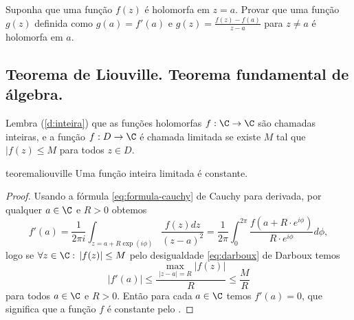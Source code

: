 \begin{problema}
\label{p:divide-holo}
Suponha que uma função $f(z)$ é holomorfa em $z=a$.
Provar que uma função $g(z)$ definida como $g(a) = f'(a)$
e $g(z) = \frac{f(z)-f(a)}{z-a}$ para $z\ne a$ é holomorfa em $a$.
\end{problema}

\subsection{Teorema de Liouville. Teorema fundamental de álgebra.}

Lembra (\cref{d:inteira}) que as funções holomorfas $f:\C\to\C$ são chamadas inteiras,
e a função $f:D\to\C$ é chamada limitada se existe $M$ tal que $|f(z)\leq M$ para todos $z\in D$.
\begin{restatable}[Liouville]{teorema}{liouville} \label{t:liouville}
Uma função inteira limitada é constante.
\end{restatable}
\begin{proof}
Usando a fórmula \eqref{eq:formula-cauchy} de Cauchy para derivada, por qualquer $a\in\C$ e $R>0$ obtemos
\[ f'(a) = \frac{1}{2\pi i} \int_{z=a + R \exp(i\phi)} \frac{f(z)dz}{(z-a)^2} 
= \frac{1}{2\pi} \int_0^{2\pi} \frac{f(a+R\cdot e^{i\phi})}{R\cdot e^{i\phi}} d\phi, \]
logo se $\forall z\in\C:\, |f(z)|\leq M$ pelo desigualdade \eqref{eq:darboux} de Darboux temos
\[ |f'(a)| \leq \frac{\max_{|z-a|=R} |f(z)|}{R} \leq \frac{M}{R}  \]
para todos $a\in \C$ e $R>0$. Então para cada $a\in\C$ temos $f'(a) = 0$,
que significa que a função $f$ é constante pelo .
\end{proof}

